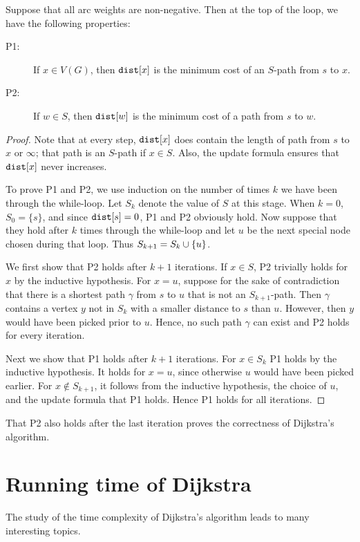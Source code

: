 \begin{Theorem}
\label{thm:dijkstra} Suppose that all arc weights are non-negative. 
Then at the top of the  loop, we have the following properties:
\begin{description}
  \item[P1:] If $x \in V(G)$, then $\operatorname{\text{\texttt{dist}}}[x]$ is the minimum cost of an $S$-path from $s$ to $x$.
  \item[P2:] If $w \in S$, then $\operatorname{\text{\texttt{dist}}}[w]$ is the minimum cost of a path from $s$ to $w$.
\end{description}
\end{Theorem}
\begin{proof} 
Note that at every step, $\operatorname{\text{\texttt{dist}}}[x]$ does contain the length of  path from $s$ to $x$ or $\infty$; 
that path is an $S$-path if $x \in S$. 
Also, the update formula ensures that $\operatorname{\text{\texttt{dist}}}[x]$ never increases. 

To prove P1 and P2, we use induction on the number of times $k$ we
have been through the while-loop. Let $S_k$ denote the value of $S$
at this stage. 
When $k = 0$, $S_0 = \{s\}$, and since $\operatorname{\text{\texttt{dist}}}[s] = 0$, P1 and P2 obviously hold. 
Now suppose that they hold after $k$ times through the while-loop 
and let $u$ be the next special node chosen during that loop. 
Thus $S_{k+1} = S_k \cup \mbox{$\{u\}$}$.

We first show that P2 holds after $k + 1$ iterations.
If $x \in S$, P2 trivially holds for $x$ by the inductive hypothesis. 
For $x = u$, suppose for the sake of contradiction that there is a shortest path $\gamma$ from $s$ to $u$ 
that is not an $S_{k+1}$-path.
Then $\gamma$ contains a vertex $y$ not in $S_{k}$ with a smaller distance to $s$ than $u$. 
However, then $y$ would have been picked prior to $u$.
Hence, no such path $\gamma$ can exist and P2 holds for every iteration.

Next we show that P1 holds after $k + 1$ iterations.
For $x \in S_k$ P1 holds by the inductive hypothesis.
It holds for $x = u$, since otherwise $u$ would have been picked earlier.
For $x \not \in S_{k+1}$, it follows from the inductive hypothesis, the choice of $u$, and the update formula that P1 holds. 
Hence P1 holds for all iterations.
\end{proof}

That P2 also holds after the last iteration proves the correctness of Dijkstra's algorithm.

\section{Running time of Dijkstra}
The study of the time complexity of Dijkstra's algorithm leads to many interesting topics.

